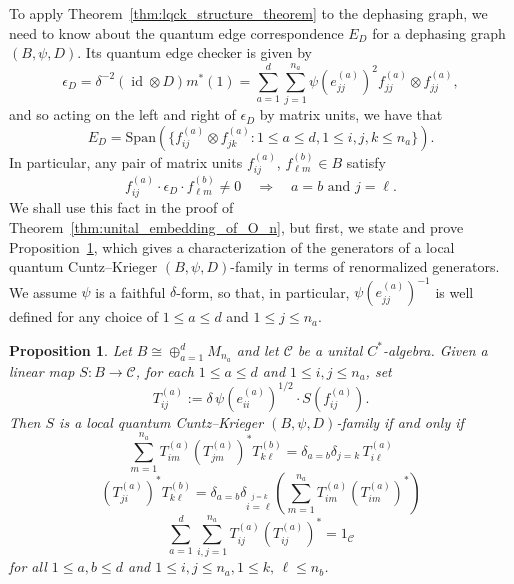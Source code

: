 \documentclass[11pt]{article}
\theoremstyle{plain}
\newtheorem{proposition}[lemma]{Proposition}
\theoremstyle{nonumberplain}
\theoremstyle{plain}
\theoremstyle{nonumberplain}
\DeclareMathOperator{\id}{id}
\newcommand\1{{\bf 1}}
\newcommand{\<}{\left\langle}
\renewcommand{\>}{\right\rangle}
\newcommand{\lp}{\left(}
\newcommand{\rp}{\right)}
\newcommand{\spn}[1]{\text{Span}\lp #1\rp} %
\begin{document}

To apply Theorem~\ref{thm:lqck_structure_theorem} to the dephasing graph, we need to know about the quantum edge correspondence $E_D$ for a dephasing graph $(B,\psi,D)$. Its quantum edge checker is given by
\[
\epsilon_D
=
\delta^{-2} (\id \otimes D)m^*(1)
=
\sum_{a=1}^d\sum_{j=1}^{n_a} \psi(e_{jj}^{(a)})^2 f_{jj}^{(a)}\otimes f_{jj}^{(a)},
\]
and so acting on the left and right of $\epsilon_D$ by matrix units, we have that
\[
E_D
=
\spn{\{f^{(a)}_{ij}\otimes f_{jk}^{(a)}: 1\leq a\leq d,1\leq i,j,k\leq n_a\}}.
\]
In particular, any pair of matrix units $f_{ij}^{(a)}$, $f_{\ell m}^{(b)}\in B$ satisfy
\begin{equation}\label{eq:cyclic_generator_dephasing}
f_{ij}^{(a)}\cdot \epsilon_D \cdot f_{\ell m}^{(b)}
\neq 0
\quad \Longrightarrow \quad
a=b\text{ and }j=\ell.
\end{equation}
We shall use this fact in the proof of Theorem~\ref{thm:unital_embedding_of_O_n}, but first, we state and prove Proposition~\ref{prop:LQCK_relations_for_dephasing}, which gives a characterization of the generators of a local quantum Cuntz--Krieger $(B,\psi,D)$-family in terms of renormalized generators. We assume $\psi$ is a faithful $\delta$-form, so that, in particular, $\psi(e_{jj}^{(a)})^{-1}$ is well defined for any choice of $1\leq a\leq d$ and $1\leq j\leq n_a$.


\begin{proposition}\label{prop:LQCK_relations_for_dephasing}
    Let $B\cong \oplus_{a=1}^d M_{n_a}$ and let $\mathcal{C}$ be a unital $C^*$-algebra. Given a linear map $S:B\to \mathcal{C}$, for each $1\leq a \leq d$ and $1\leq i,j\leq n_a$, set 
    \[
    T^{(a)}_{ij}
    :=\delta \,\psi(e_{ii}^{(a)})^{1/2}\cdot S(f^{(a)}_{ij}).
    \] Then $S$ is a local quantum Cuntz--Krieger $(B,\psi,D)$-family if and only if    \begin{equation}\label{eq:LQCK1}\displaystyle \sum\limits_{m=1}^{n_a} T^{(a)}_{im}(T^{(a)}_{jm})^*T^{(b)}_{k\ell}= \delta_{a=b}\delta_{j=k}\, T^{(a)}_{i\ell}\end{equation}%
    \begin{equation}\label{eq:LQCK2}
    \displaystyle (T^{(a)}_{ji})^*T^{(b)}_{k\ell} 
    = \delta_{a=b}\delta_{\stackrel{j=k}{i=\ell}} \left(\sum_{m=1}^{n_a} T^{(a)}_{im}(T^{(a)}_{im})^*\right)
    \end{equation} %
    \begin{equation}\label{eq:LQCK3}
    \displaystyle \sum_{a=1}^d \sum\limits_{i,j=1}^{n_a} T^{(a)}_{ij}(T^{(a)}_{ij})^*
    =1_{\mathcal{C}}
    \end{equation}
for all $1\leq a,b\leq d$ and $1\leq i,j\leq n_a, 1\leq k,\, \ell\leq n_b$.
\end{proposition}
\end{document}
